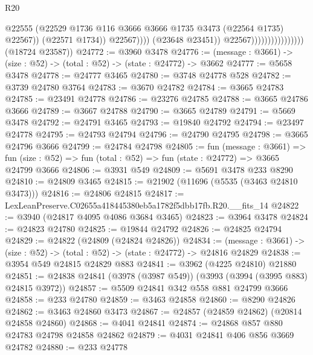 \begin{lexlean}{R20}
\begin{coremodule}
                                                    @22555
                                                    (@22529
                                                      @1736
                                                      @116
                                                      @3666
                                                      @3666
                                                      @1735
                                                      @3473
                                                      (@22564 @1735)
                                                      @22567))
                                                  (@22571 @1734))
                                                @22567))))
                                        (@23648 @23451))
                                      @22567))))))))))))))))
      (@18724 @23587))
@24772 := @3960 @3478
@24776 := (message : @3661) -> (size : @52) -> (total : @52) -> (state : @24772) -> @3662
@24777 := @5658 @3478
@24778 := @24777 @3465
@24780 := @3748 @24778 @528
@24782 := @3739 @24780 @3764
@24783 := @3670 @24782
@24784 := @3665 @24783
@24785 := @23491 @24778
@24786 := @23276 @24785
@24788 := @3665 @24786 @3666
@24789 := @3667 @24788
@24790 := @3665 @24789
@24791 := @5669 @3478
@24792 := @24791 @3465
@24793 := @19840 @24792
@24794 := @23497 @24778
@24795 := @24793 @24794
@24796 := @24790 @24795
@24798 := @3665 @24796 @3666
@24799 := @24784 @24798
@24805 := fun (message : @3661) =>
  fun (size : @52) => fun (total : @52) => fun (state : @24772) => @3665 @24799 @3666
@24806 := @3931 @549
@24809 := @5691 @3478 @233 @8290
@24810 := @24809 @3465
@24815 := @21902 (@11696 (@5535 (@3463 @24810 @3473)))
@24816 := @24806 @24815
@24817 := LexLeanPreserve.C02655a418445380eb5a1782f5dbb17fb.R20.__fits_14
@24822 := @3940 (@24817 @4095 @4086 @3684 @3465)
@24823 := @3964 @3478
@24824 := @24823 @24780
@24825 := @19844 @24792
@24826 := @24825 @24794
@24829 := @24822 (@24809 (@24824 @24826))
@24834 := (message : @3661) -> (size : @52) -> (total : @52) -> (state : @24772) -> @24816 @24829
@24838 := @3954 @549 @24815 @24829 @883
@24841 := @3962 (@4225 @24810) @21880
@24851 := @24838 @24841 (@3978 (@3987 @549)) (@3993 (@3994 (@3995 @883) @24815 @3972))
@24857 := @5509 @24841 @342 @558 @881 @24799 @3666
@24858 := @233 @24780
@24859 := @3463 @24858
@24860 := @8290 @24826
@24862 := @3463 @24860 @3473
@24867 := @24857 (@24859 @24862) (@20814 @24858 @24860)
@24868 := @4041 @24841
@24874 := @24868 @857 @880 @24783 @24798 @24858 @24862
@24879 := @4031 @24841 @406 @856 @3669 @24782
@24880 := @233 @24778

\end{coremodule}
\end{lexlean}
